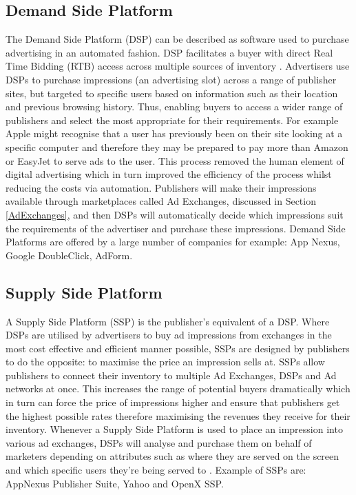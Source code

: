 \documentclass[12pt]{article}
\begin{document}
\subsection{ Demand Side Platform} \label{DSP}
The Demand Side Platform (DSP) can be described as software used to purchase advertising in an automated fashion. DSP facilitates a buyer with direct Real Time Bidding (RTB) access across multiple sources of inventory \parencite{introDSP}. Advertisers use DSPs to purchase impressions (an advertising slot) across a range of publisher sites, but targeted to specific users based on information such as their location and previous browsing history. Thus, enabling buyers to access a wider range of publishers and select the most appropriate for their requirements. For example Apple might recognise that a user has previously been on their site looking at a specific computer and therefore they may be prepared to pay more than Amazon or EasyJet to serve ads to the user. This process removed the human element of digital advertising which in turn improved the efficiency of the process whilst reducing the costs via automation. Publishers will make their impressions available through marketplaces called Ad Exchanges, discussed in Section \ref{AdExchanges}, and then DSPs will automatically decide which impressions suit the requirements of the advertiser and purchase these impressions. Demand Side Platforms are offered by a large number of companies for example: App Nexus, Google DoubleClick, AdForm. 

\subsection{ Supply Side Platform} \label{SSP}
A Supply Side Platform (SSP) is the publisher's equivalent of a DSP. Where DSPs are utilised by advertisers to buy ad impressions from exchanges in the most cost effective and efficient manner possible, SSPs are designed by publishers to do the opposite: to maximise the price an impression sells at. SSPs allow publishers to connect their inventory to multiple Ad Exchanges, DSPs and Ad networks at once. This increases the range of potential buyers dramatically which in turn can force the price of impressions higher and ensure that publishers get the highest possible rates therefore maximising the revenues they receive for their inventory. Whenever a Supply Side Platform is used to place an impression into various ad exchanges, DSPs will analyse and purchase them on behalf of marketers depending on attributes such as where they are served on the screen and which specific users they're being served to \parencite{introDSP}. Example of SSPs are: AppNexus Publisher Suite, Yahoo and OpenX SSP.  
\end{document}
